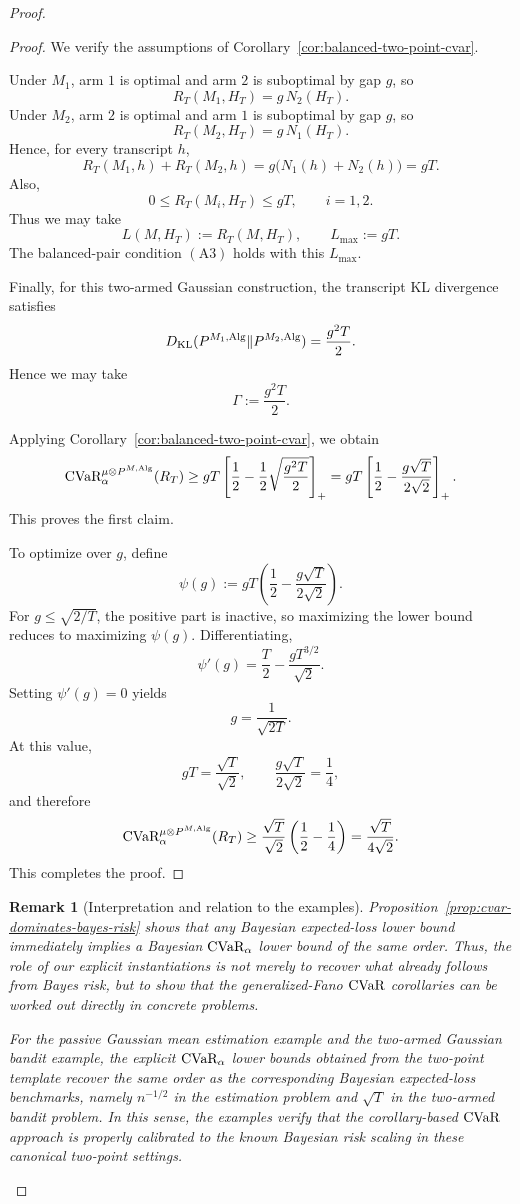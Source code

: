 \documentclass[conference]{IEEEtran}
\newtheorem{remark}{Remark}
\begin{document}
\begin{proof}[Proof]
\begin{proof}
We verify the assumptions of Corollary~\ref{cor:balanced-two-point-cvar}.

Under \(M_1\), arm \(1\) is optimal and arm \(2\) is suboptimal by gap \(g\), so
\[
R_T(M_1,H_T)=g\,N_2(H_T).
\]
Under \(M_2\), arm \(2\) is optimal and arm \(1\) is suboptimal by gap \(g\), so
\[
R_T(M_2,H_T)=g\,N_1(H_T).
\]
Hence, for every transcript \(h\),
\[
R_T(M_1,h)+R_T(M_2,h)
=
g\bigl(N_1(h)+N_2(h)\bigr)
=
gT.
\]
Also,
\[
0\le R_T(M_i,H_T)\le gT,
\qquad i=1,2.
\]
Thus we may take
\[
L(M,H_T):=R_T(M,H_T),
\qquad
L_{\max}:=gT.
\]
The balanced-pair condition \((\mathrm{A3})\) holds with this \(L_{\max}\).

Finally, for this two-armed Gaussian construction, the transcript KL divergence satisfies
\[
D_{\textup{KL}}(P^{M_1,\textup{Alg}}\|P^{M_2,\textup{Alg}})
=
\frac{g^2T}{2}.
\]
Hence we may take
\[
\Gamma:=\frac{g^2T}{2}.
\]

Applying Corollary~\ref{cor:balanced-two-point-cvar}, we obtain
\[
\textup{CVaR}_\alpha^{\mu\otimes P^{M,\textup{Alg}}}(R_T)
\ge
gT\left[\frac12-\frac{1}{2}\sqrt{\frac{g^2T}{2}}\right]_+
=
gT\left[\frac12-\frac{g\sqrt{T}}{2\sqrt{2}}\right]_+.
\]
This proves the first claim.

To optimize over \(g\), define
\[
\psi(g):=
gT\left(\frac12-\frac{g\sqrt{T}}{2\sqrt{2}}\right).
\]
For \(g\le \sqrt{2/T}\), the positive part is inactive, so maximizing the lower bound reduces to maximizing \(\psi(g)\). Differentiating,
\[
\psi'(g)=\frac{T}{2}-\frac{gT^{3/2}}{\sqrt{2}}.
\]
Setting \(\psi'(g)=0\) yields
\[
g=\frac{1}{\sqrt{2T}}.
\]
At this value,
\[
gT=\frac{\sqrt{T}}{\sqrt{2}},
\qquad
\frac{g\sqrt{T}}{2\sqrt{2}}=\frac14,
\]
and therefore
\[
\textup{CVaR}_\alpha^{\mu\otimes P^{M,\textup{Alg}}}(R_T)
\ge
\frac{\sqrt{T}}{\sqrt{2}}\left(\frac12-\frac14\right)
=
\frac{\sqrt{T}}{4\sqrt{2}}.
\]
This completes the proof.
\end{proof}
\begin{remark}[Interpretation and relation to the examples]
\label{rem:comparison-with-bayes-risk}
Proposition~\ref{prop:cvar-dominates-bayes-risk} shows that any Bayesian expected-loss lower bound immediately implies a Bayesian \(\textup{CVaR}_\alpha\) lower bound of the same order. Thus, the role of our explicit instantiations is not merely to recover what already follows from Bayes risk, but to show that the generalized-Fano \(\textup{CVaR}\) corollaries can be worked out directly in concrete problems.

For the passive Gaussian mean estimation example and the two-armed Gaussian bandit example, the explicit \(\textup{CVaR}_\alpha\) lower bounds obtained from the two-point template recover the same order as the corresponding Bayesian expected-loss benchmarks, namely \(n^{-1/2}\) in the estimation problem and \(\sqrt{T}\) in the two-armed bandit problem. In this sense, the examples verify that the corollary-based \(\textup{CVaR}\) approach is properly calibrated to the known Bayesian risk scaling in these canonical two-point settings.
\end{remark}
\fi



\end{proof}
\end{document}
